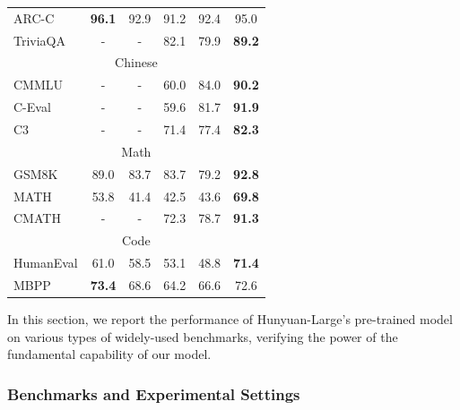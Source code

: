 \documentclass{article}
\begin{document}
\begin{table}[!hbtp]
{\begin{tabular}{lccccc}
ARC-C               & \textbf{96.1} & 92.9         & 91.2          & 92.4        & 95.0          \\
TriviaQA            & -             & -            & 82.1          & 79.9        & \textbf{89.2} \\ \hline
\multicolumn{6}{c}{Chinese}                                                                      \\
CMMLU               & -             & -            & 60.0          & 84.0        & \textbf{90.2} \\
C-Eval              & -             & -            & 59.6          & 81.7        & \textbf{91.9} \\
C3                  & -             & -            & 71.4          & 77.4        & \textbf{82.3} \\ \hline
\multicolumn{6}{c}{Math}                                                                         \\
GSM8K               & 89.0          & 83.7         & 83.7          & 79.2        & \textbf{92.8} \\
MATH                & 53.8          & 41.4         & 42.5          & 43.6        & \textbf{69.8} \\
CMATH               & -             & -            & 72.3          & 78.7        & \textbf{91.3} \\ \hline
\multicolumn{6}{c}{Code}                                                                         \\
HumanEval           & 61.0          & 58.5            & 53.1          & 48.8        & \textbf{71.4} \\
MBPP                & \textbf{73.4}          & 68.6         & 64.2          & 66.6        & 72.6 \\ 
\bottomrule
\end{tabular}
	}
	\label{tab:main_pre_train}
\end{table}

In this section, we report the performance of Hunyuan-Large's pre-trained model on various types of widely-used benchmarks, verifying the power of the fundamental capability of our model.

\subsubsection{Benchmarks and Experimental Settings}
\end{document}
